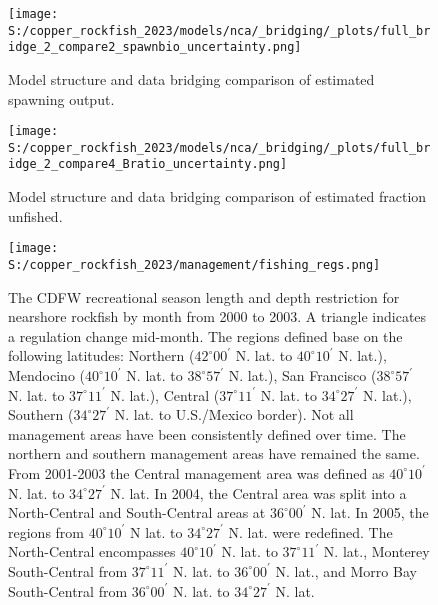 \documentclass[11pt,
  english,
  letterpaper,
]{article}
\begin{document}
\pagebreak

\begin{figure}
\centering
\texttt{[image: S:/copper\_rockfish\_2023/models/nca/\_bridging/\_plots/full\_bridge\_2\_compare2\_spawnbio\_uncertainty.png]}
\caption{Model structure and data bridging comparison of estimated spawning output.\label{fig:data-bridge-ssb-2}}
\end{figure}

\pagebreak

\begin{figure}
\centering
\texttt{[image: S:/copper\_rockfish\_2023/models/nca/\_bridging/\_plots/full\_bridge\_2\_compare4\_Bratio\_uncertainty.png]}
\caption{Model structure and data bridging comparison of estimated fraction unfished.\label{fig:data-bridge-depl-2}}
\end{figure}

\pagebreak

\begin{figure}
\centering
\texttt{[image: S:/copper\_rockfish\_2023/management/fishing\_regs.png]}
\caption{The CDFW recreational season length and depth restriction for nearshore rockfish by month from 2000 to 2003. A triangle indicates a regulation change mid-month. The regions defined base on the following latitudes: Northern (\(42^\circ 00^\prime\) N. lat. to \(40^\circ 10^\prime\) N. lat.), Mendocino (\(40^\circ 10^\prime\) N. lat. to \(38^\circ 57^\prime\) N. lat.), San Francisco (\(38^\circ 57^\prime\) N. lat. to \(37^\circ 11^\prime\) N. lat.), Central (\(37^\circ 11^\prime\) N. lat. to \(34^\circ 27^\prime\) N. lat.), Southern (\(34^\circ 27^\prime\) N. lat. to U.S./Mexico border). Not all management areas have been consistently defined over time. The northern and southern management areas have remained the same. From 2001-2003 the Central management area was defined as \(40^\circ 10^\prime\) N. lat. to \(34^\circ 27^\prime\) N. lat. In 2004, the Central area was split into a North-Central and South-Central areas at \(36^\circ 00^\prime\) N. lat. In 2005, the regions from \(40^\circ 10^\prime\) N lat. to \(34^\circ 27^\prime\) N. lat. were redefined. The North-Central encompasses \(40^\circ 10^\prime\) N. lat. to \(37^\circ 11^\prime\) N. lat., Monterey South-Central from \(37^\circ 11^\prime\) N. lat. to \(36^\circ 00^\prime\) N. lat., and Morro Bay South-Central from \(36^\circ 00^\prime\) N. lat. to \(34^\circ 27^\prime\) N. lat.\label{fig:depth-closures}}
\end{figure}
\end{document}

